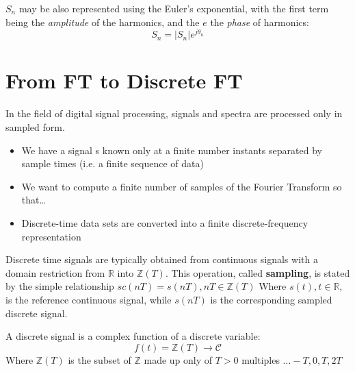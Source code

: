 $S_n$ may be also represented using the Euler's exponential, with the first term being the \textit{amplitude} of the harmonics, and the $e$ the \textit{phase} of harmonics:
\begin{equation}
   S_n=|S_n|e^{j\theta_n}
\end{equation}

\section{From FT to Discrete FT}
In the field of digital signal processing, signals and spectra are processed only in sampled form.
\begin{itemize}
   \item We have a signal s known only at a finite number instants separated by sample times (i.e. a finite sequence of data)
   \item We want to compute a finite number of samples of the Fourier Transform so that\dots
   \item Discrete-time data sets are converted into a finite discrete-frequency representation
\end{itemize}

Discrete time signals are typically obtained from continuous signals with a domain restriction from $\mathbb{R}$ into $\mathbb{Z}(T)$.
This operation, called \textbf{sampling}, is stated by the simple relationship
\(
   sc(nT) = s(nT) , nT \in \mathbb{Z}(T)
\)
Where $s(t) , t \in \mathbb{R}$, is the reference continuous signal, while $s(nT)$ is the corresponding sampled discrete signal.

\begin{definition}
   A discrete signal is a complex function of a discrete variable:
   \[
      f(t)= \mathbb{Z}(T) \rightarrow \mathcal{C}
   \]
   Where $\mathbb{Z}(T)$ is the subset of $\mathbb{Z}$ made up only of $T>0$ multiples ${\dots -T,0,T,2T}$
\end{definition}

